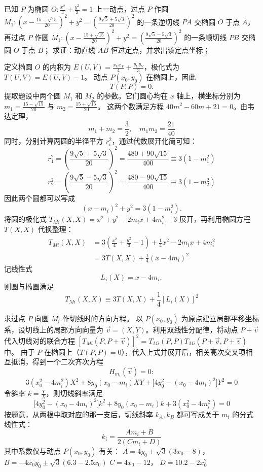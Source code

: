 \begin{exercise}
已知 \(P\) 为椭圆 \(O: \frac{x^2}{4} + \frac{y^2}{3} = 1\) 上一动点，过点 \(P\) 作圆 \(M_1: \left(x - \frac{15 - \sqrt{15}}{20}\right)^2 + y^2 = \left(\frac{9\sqrt{5} + 5\sqrt{3}}{20}\right)^2\) 的一条逆切线 \(PA\) 交椭圆 \(O\) 于点 \(A\)，再过点 \(P\) 作圆 \(M_1: \left(x - \frac{15 + \sqrt{15}}{20}\right)^2 + y^2 = \left(\frac{9\sqrt{5} - 5\sqrt{3}}{20}\right)^2\) 的一条顺切线 \(PB\) 交椭圆 \(O\) 于点 \(B\)；
求证：动直线 \(AB\) 恒过定点，并求出该定点坐标；
\end{exercise}
\begin{solution}
定义椭圆 $O$ 的内积为 $E(U,V) = \frac{x_U x_V}{4} + \frac{y_U y_V}{3}$，极化式为 $T(U,V) = E(U,V) - 1$。
动点 $P(x_0, y_0)$ 在椭圆上，因此
$$T(P,P) = 0.$$
提取题设中两个圆 $M_1$ 和 $M_2$ 的参数。它们圆心均在 $x$ 轴上，横坐标分别为 $m_1 = \frac{15 - \sqrt{15}}{20}$ 与 $m_2 = \frac{15 + \sqrt{15}}{20}$。
这两个数满足方程 $40m^2 - 60m + 21 = 0$。由韦达定理，
$$ m_1 + m_2 = \frac{3}{2}, \quad m_1 m_2 = \frac{21}{40} $$
同时，分别计算两圆的半径平方 $r_i^2$，通过代数展开化简可知：
$$ r_1^2 = \left(\frac{9\sqrt{5} + 5\sqrt{3}}{20}\right)^2 = \frac{480 + 90\sqrt{15}}{400} \equiv 3(1 - m_1^2) $$
$$ r_2^2 = \left(\frac{9\sqrt{5} - 5\sqrt{3}}{20}\right)^2 = \frac{480 - 90\sqrt{15}}{400} \equiv 3(1 - m_2^2) $$
因此两个圆都可以写成
$$(x - m_i)^2 + y^2 = 3(1 - m_i^2).$$
将圆的极化式 $T_{Mi}(X,X) = x^2 + y^2 - 2m_i x + 4m_i^2 - 3$ 展开，再利用椭圆方程 $T(X,X)$ 代换整理：
\begin{align*}
T_{Mi}(X,X) &= 3\left(\frac{x^2}{4} + \frac{y^2}{3} - 1\right) + \frac{1}{4}x^2 - 2m_i x + 4m_i^2 \\
&= 3T(X,X) + \frac{1}{4}(x - 4m_i)^2
\end{align*}
记线性式
$$L_i(X) = x - 4m_i,$$
则圆与椭圆满足
$$ T_{Mi}(X,X) \equiv 3T(X,X) + \frac{1}{4}[L_i(X)]^2 $$

求过点 $P$ 向圆 $M_i$ 作切线时的方向方程。
以 $P(x_0, y_0)$ 为原点建立局部平移坐标系，设切线上的局部方向向量为 $\vec{v} = (X, Y)$。利用双线性分配律，将动点 $P+\vec{v}$ 代入切线对的联合方程 $[T_{Mi}(P, P+\vec{v})]^2 = T_{Mi}(P,P) T_{Mi}(P+\vec{v}, P+\vec{v})$ 中。
由于 $P$ 在椭圆上（$T(P,P) = 0$），代入上式并展开后，相关高次交叉项相互抵消，得到一个二次齐次方程
$$H_{m_i}(\vec{v}) = 0:$$
$$ 3(x_0^2 - 4m_i^2) X^2 + 8y_0(x_0 - m_i) XY + \big[4y_0^2 - (x_0 - 4m_i)^2\big] Y^2 = 0 $$
令斜率 $k = \frac{Y}{X}$，则切线斜率满足
$$ \big[4y_0^2 - (x_0 - 4m_i)^2\big] k^2 + 8y_0(x_0 - m_i) k + 3(x_0^2 - 4m_i^2) = 0 $$
按题意，从两根中取对应的那一支后，切线斜率 $k_A, k_B$ 都可写成关于 $m_i$ 的分式线性式：
$$ k_i = \frac{A m_i + B}{2(C m_i + D)} $$
其中系数仅与动点 $P(x_0,y_0)$ 有关：
$A = 4y_0 \pm \sqrt{3}(3x_0 - 8)$， $B = -4x_0 y_0 \pm \sqrt{3}(6.3 - 2.5x_0)$
$C = 4x_0 - 12$， $D = 10.2 - 2x_0^2$


\end{solution}
